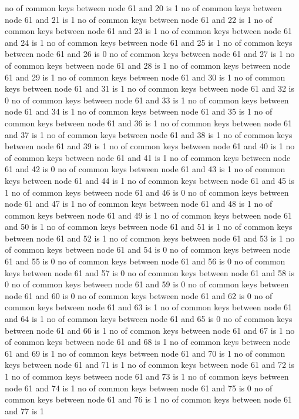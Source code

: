 no of common keys between node 61 and 20 is 1
no of common keys between node 61 and 21 is 1
no of common keys between node 61 and 22 is 1
no of common keys between node 61 and 23 is 1
no of common keys between node 61 and 24 is 1
no of common keys between node 61 and 25 is 1
no of common keys between node 61 and 26 is 0
no of common keys between node 61 and 27 is 1
no of common keys between node 61 and 28 is 1
no of common keys between node 61 and 29 is 1
no of common keys between node 61 and 30 is 1
no of common keys between node 61 and 31 is 1
no of common keys between node 61 and 32 is 0
no of common keys between node 61 and 33 is 1
no of common keys between node 61 and 34 is 1
no of common keys between node 61 and 35 is 1
no of common keys between node 61 and 36 is 1
no of common keys between node 61 and 37 is 1
no of common keys between node 61 and 38 is 1
no of common keys between node 61 and 39 is 1
no of common keys between node 61 and 40 is 1
no of common keys between node 61 and 41 is 1
no of common keys between node 61 and 42 is 0
no of common keys between node 61 and 43 is 1
no of common keys between node 61 and 44 is 1
no of common keys between node 61 and 45 is 1
no of common keys between node 61 and 46 is 0
no of common keys between node 61 and 47 is 1
no of common keys between node 61 and 48 is 1
no of common keys between node 61 and 49 is 1
no of common keys between node 61 and 50 is 1
no of common keys between node 61 and 51 is 1
no of common keys between node 61 and 52 is 1
no of common keys between node 61 and 53 is 1
no of common keys between node 61 and 54 is 0
no of common keys between node 61 and 55 is 0
no of common keys between node 61 and 56 is 0
no of common keys between node 61 and 57 is 0
no of common keys between node 61 and 58 is 0
no of common keys between node 61 and 59 is 0
no of common keys between node 61 and 60 is 0
no of common keys between node 61 and 62 is 0
no of common keys between node 61 and 63 is 1
no of common keys between node 61 and 64 is 1
no of common keys between node 61 and 65 is 0
no of common keys between node 61 and 66 is 1
no of common keys between node 61 and 67 is 1
no of common keys between node 61 and 68 is 1
no of common keys between node 61 and 69 is 1
no of common keys between node 61 and 70 is 1
no of common keys between node 61 and 71 is 1
no of common keys between node 61 and 72 is 1
no of common keys between node 61 and 73 is 1
no of common keys between node 61 and 74 is 1
no of common keys between node 61 and 75 is 0
no of common keys between node 61 and 76 is 1
no of common keys between node 61 and 77 is 1
